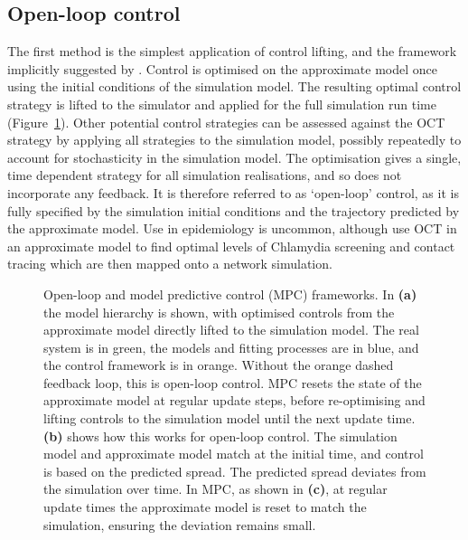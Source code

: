 \subsection{Open-loop control}

The first method is the simplest application of control lifting, and the framework implicitly suggested by \citet{an_optimization_2017}. Control is optimised on the approximate model once using the initial conditions of the simulation model. The resulting optimal control strategy is lifted to the simulator and applied for the full simulation run time (Figure~\ref{fig:ch4:mpc_framework}). Other potential control strategies can be assessed against the OCT strategy by applying all strategies to the simulation model, possibly repeatedly to account for stochasticity in the simulation model. The optimisation gives a single, time dependent strategy for all simulation realisations, and so does not incorporate any feedback. It is therefore referred to as `open-loop' control, as it is fully specified by the simulation initial conditions and the trajectory predicted by the approximate model. Use in epidemiology is uncommon, although \citet{clarke_approximating_2013} use OCT in an approximate model to find optimal levels of Chlamydia screening and contact tracing which are then mapped onto a network simulation.

\begin{figure}
    \begin{center}
        \hspace{0em}
        \hspace{0em}

        \caption[Open-loop and model predictive control frameworks]{Open-loop and model predictive control (MPC) frameworks. In \textbf{(a)} the model hierarchy is shown, with optimised controls from the approximate model directly lifted to the simulation model. The real system is in green, the models and fitting processes are in blue, and the control framework is in orange. Without the orange dashed feedback loop, this is open-loop control. MPC resets the state of the approximate model at regular update steps, before re-optimising and lifting controls to the simulation model until the next update time. \textbf{(b)} shows how this works for open-loop control. The simulation model and approximate model match at the initial time, and control is based on the predicted spread. The predicted spread deviates from the simulation over time. In MPC, as shown in \textbf{(c)}, at regular update times the approximate model is reset to match the simulation, ensuring the deviation remains small.
        \label{fig:ch4:mpc_framework}}
    \end{center}
\end{figure}

